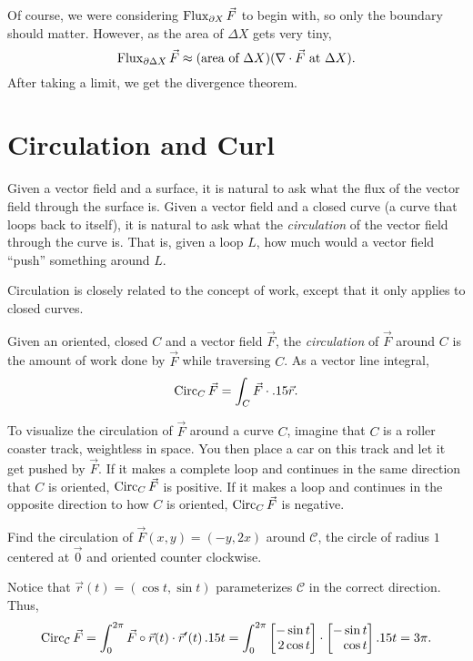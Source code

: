 Of course, we were considering $\operatorname{Flux}_{\partial X}\vec F$ to begin with,
so only the boundary should matter.  However, as the area of $\Delta X$ gets very tiny,
\[
	\operatorname{Flux}_{\partial \Delta X} \vec F \approx (\text{area of }\Delta X)(\nabla \cdot \vec F
	\text{ at }\Delta X).
\]
After taking a limit, we get the divergence theorem.


\section{Circulation and Curl}

Given a vector field and a surface, it is natural
to ask what the flux of the vector field through the surface is.
Given a vector field and a closed curve (a curve that loops back
to itself), it is natural to ask what the \emph{circulation}
of the vector field through the curve is.  That is, given a loop $L$,
how much would a vector field ``push'' something around $L$.

Circulation is closely related to the concept of work, except that
it only applies to closed curves.

\begin{definition}[Circulation]
	Given an oriented, closed $C$ and a vector field $\vec F$, the 
	\emph{circulation} of $\vec F$ around $C$ is the amount
	of work done by $\vec F$ while traversing $C$.  As a
	vector line integral,
	\[
		\operatorname{Circ}_C\vec F = \int_C \vec F \cdot .15 \vec r.
	\]
\end{definition}

To visualize the circulation of $\vec F$ around a curve $C$, imagine that
$C$ is a roller coaster track, weightless in space.  You then place a car on
this track and let it get pushed by $\vec F$.  If it makes a complete loop and
continues in the same direction that $C$ is oriented, $\operatorname{Circ}_C\vec F$ is positive.
If it makes a loop and continues in the opposite direction to how $C$ is 
oriented, $\operatorname{Circ}_C \vec F$ is negative.

\begin{example}
	Find the circulation of $\vec F(x,y) = (-y, 2x)$ around $\mathcal C$, the circle
	of radius $1$ centered at $\vec 0$ and oriented counter clockwise.

	Notice that $\vec r(t) = (\cos t,\sin t)$ parameterizes $\mathcal C$ in the
	correct direction.  Thus,
	\[
		\Circ_{\mathcal C}\vec F = \int_0^{2\pi}\vec F\circ \vec r(t) \cdot \vec r'(t)\,\d t
		=\int_0^{2\pi} \mat{-\sin t\\2\cos t}\cdot \mat{-\sin t\\\cos t}\d t = 3\pi.
	\]
\end{example}

